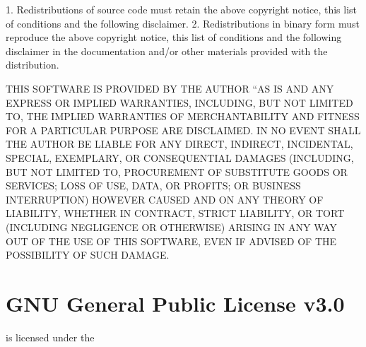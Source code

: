\documentclass[letterpaper,10pt,english]{sphinxmanual}
\begin{document}
\begin{sphinxVerbatim}[commandchars=\\\{\}]
 1. Redistributions of source code must retain the above copyright
    notice, this list of conditions and the following disclaimer.
 2. Redistributions in binary form must reproduce the above copyright
    notice, this list of conditions and the following disclaimer in
    the documentation and/or other materials provided with the
    distribution.

THIS SOFTWARE IS PROVIDED BY THE AUTHOR ``AS IS\PYGZsq{}\PYGZsq{} AND ANY EXPRESS OR
IMPLIED WARRANTIES, INCLUDING, BUT NOT LIMITED TO, THE IMPLIED
WARRANTIES OF MERCHANTABILITY AND FITNESS FOR A PARTICULAR PURPOSE ARE
DISCLAIMED. IN NO EVENT SHALL THE AUTHOR BE LIABLE FOR ANY DIRECT,
INDIRECT, INCIDENTAL, SPECIAL, EXEMPLARY, OR CONSEQUENTIAL DAMAGES
(INCLUDING, BUT NOT LIMITED TO, PROCUREMENT OF SUBSTITUTE GOODS OR
SERVICES; LOSS OF USE, DATA, OR PROFITS; OR BUSINESS INTERRUPTION)
HOWEVER CAUSED AND ON ANY THEORY OF LIABILITY, WHETHER IN CONTRACT,
STRICT LIABILITY, OR TORT (INCLUDING NEGLIGENCE OR OTHERWISE) ARISING
IN ANY WAY OUT OF THE USE OF THIS SOFTWARE, EVEN IF ADVISED OF THE
POSSIBILITY OF SUCH DAMAGE.

\PYGZhy{}\PYGZhy{}\PYGZhy{}\PYGZhy{}\PYGZhy{}\PYGZhy{}\PYGZhy{}\PYGZhy{}\PYGZhy{}\PYGZhy{}\PYGZhy{}\PYGZhy{}\PYGZhy{}\PYGZhy{}\PYGZhy{}\PYGZhy{}\PYGZhy{}\PYGZhy{}\PYGZhy{}\PYGZhy{}\PYGZhy{}\PYGZhy{}\PYGZhy{}\PYGZhy{}\PYGZhy{}\PYGZhy{}\PYGZhy{}\PYGZhy{}\PYGZhy{}\PYGZhy{}\PYGZhy{}\PYGZhy{}\PYGZhy{}\PYGZhy{}\PYGZhy{}\PYGZhy{}\PYGZhy{}\PYGZhy{}\PYGZhy{}\PYGZhy{}\PYGZhy{}\PYGZhy{}\PYGZhy{}\PYGZhy{}\PYGZhy{}\PYGZhy{}\PYGZhy{}\PYGZhy{}\PYGZhy{}\PYGZhy{}\PYGZhy{}\PYGZhy{}\PYGZhy{}\PYGZhy{}\PYGZhy{}\PYGZhy{}\PYGZhy{}\PYGZhy{}\PYGZhy{}\PYGZhy{}\PYGZhy{}\PYGZhy{}\PYGZhy{}\PYGZhy{}\PYGZhy{}\PYGZhy{}\PYGZhy{}\PYGZhy{}\PYGZhy{}\PYGZhy{}\PYGZhy{}\PYGZhy{}\PYGZhy{}\PYGZhy{}\PYGZhy{}\PYGZhy{}\PYGZhy{}\PYGZhy{}\PYGZhy{}
\end{sphinxVerbatim}



\chapter{GNU General Public License v3.0}
\label{\detokenize{examples/gpl-3.0:gnu-general-public-license-v3-0}}\label{\detokenize{examples/gpl-3.0::doc}}
 is licensed under the 
\end{document}
